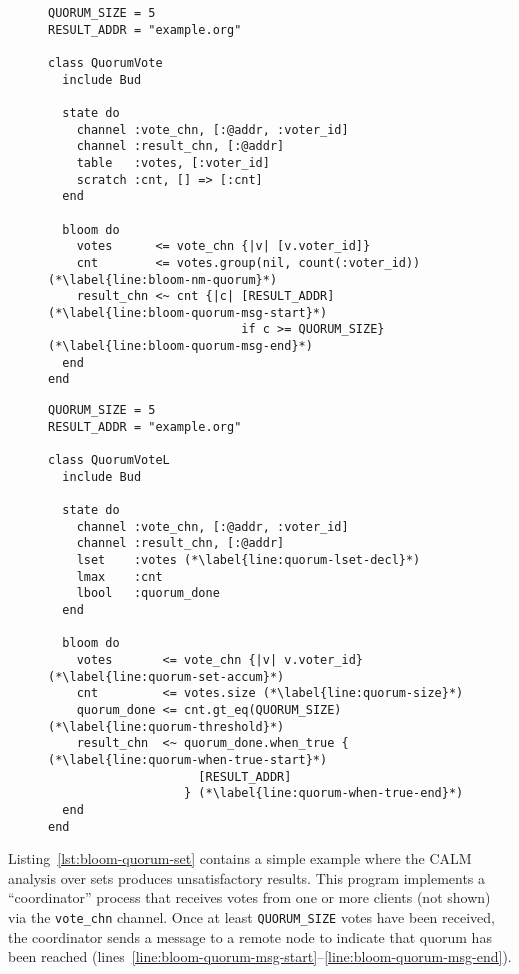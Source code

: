 \begin{figure}[t]
\begin{minipage}{.48\textwidth}
\begin{lstlisting}[caption=Quorum vote in Bloom (non-monotonic).,label=lst:bloom-quorum-set]
QUORUM_SIZE = 5
RESULT_ADDR = "example.org"

class QuorumVote
  include Bud

  state do
    channel :vote_chn, [:@addr, :voter_id]
    channel :result_chn, [:@addr]
    table   :votes, [:voter_id]
    scratch :cnt, [] => [:cnt]
  end

  bloom do
    votes      <= vote_chn {|v| [v.voter_id]}
    cnt        <= votes.group(nil, count(:voter_id)) (*\label{line:bloom-nm-quorum}*)
    result_chn <~ cnt {|c| [RESULT_ADDR] (*\label{line:bloom-quorum-msg-start}*)
                           if c >= QUORUM_SIZE} (*\label{line:bloom-quorum-msg-end}*)
  end
end
\end{lstlisting}
\end{minipage}
\begin{minipage}{.48\textwidth}
\begin{lstlisting}[caption=Quorum vote in \blooml (monotonic).,label=lst:bloom-quorum-lattice]
QUORUM_SIZE = 5
RESULT_ADDR = "example.org"

class QuorumVoteL
  include Bud

  state do
    channel :vote_chn, [:@addr, :voter_id]
    channel :result_chn, [:@addr]
    lset    :votes (*\label{line:quorum-lset-decl}*)
    lmax    :cnt
    lbool   :quorum_done
  end

  bloom do
    votes       <= vote_chn {|v| v.voter_id} (*\label{line:quorum-set-accum}*)
    cnt         <= votes.size (*\label{line:quorum-size}*)
    quorum_done <= cnt.gt_eq(QUORUM_SIZE) (*\label{line:quorum-threshold}*)
    result_chn  <~ quorum_done.when_true { (*\label{line:quorum-when-true-start}*)
                     [RESULT_ADDR]
                   } (*\label{line:quorum-when-true-end}*)
  end
end
\end{lstlisting}
\end{minipage}
\end{figure}

Listing~\ref{lst:bloom-quorum-set} contains a simple example where the CALM
analysis over sets produces unsatisfactory results. This program implements a
``coordinator'' process that receives votes from one or more clients (not shown) via
the \texttt{vote\_chn} channel. Once at least \texttt{QUORUM\_SIZE} votes have
been received, the coordinator sends a message to a remote node to indicate that
quorum has been reached
(lines~\ref{line:bloom-quorum-msg-start}--\ref{line:bloom-quorum-msg-end}).

